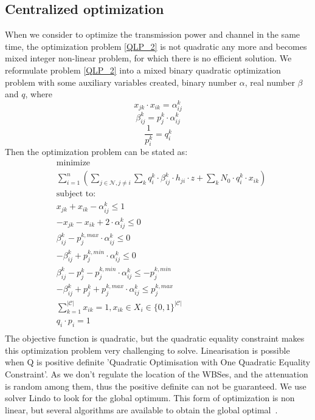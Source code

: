 \subsection{Centralized optimization}
\label{opt_channelAndPower}
When we consider to optimize the transmission power and channel in the same time, the optimization problem \ref{QLP_2} is not quadratic any more and becomes mixed integer non-linear problem, for which there is no efficient solution.
We reformulate problem \ref{QLP_2} into a mixed binary quadratic optimization problem with some auxiliary variables created, \ie binary number $\alpha$, real number $\beta$ and $q$, where
	\begin{equation}
	\label{alpha_opt}
x_{jk}\cdot x_{ik} =\alpha_{ij}^k
	\end{equation}
	\begin{equation}
	\label{beta_opt}
\beta_{ij}^k = p_j^k\cdot \alpha_{ij}^k
	\end{equation}
	\begin{equation}
	\label{q_opt}	
\frac{1}{p_i^k} = q_i^k
	\end{equation}
Then the optimization problem can be stated as:
	\begin{equation}
\label{midp}
			\begin{aligned}
			& \underset{}{\text{minimize}}\\
			&\sum\limits^{n}_{i=1}(\sum\limits_{j\in\mathcal{N}, j\neq i}\sum\limits_k q_{i}^k\cdot \beta_{ij}^k \cdot h_{ji}\cdot z + \sum\limits_k N_0\cdot q_{i}^k\cdot x_{ik})\\
			& \text{subject to:} \\
			& x_{jk} + x_{ik} - \alpha_{ij}^k\leq 1 \\
			& -x_{jk} - x_{ik} +2\cdot \alpha_{ij}^k \leq 0 \\
			& \beta_{ij}^k - p_j^{k,max}\cdot \alpha_{ij}^k \leq 0 \\
			& - \beta_{ij}^k + p_j^{k,min}\cdot \alpha_{ij}^k \leq 0 \\
			& \beta_{ij}^k - p_j^k - p_j^{k,min}\cdot \alpha_{ij}^k \leq -p_j^{k,min} \\			
			& -\beta_{ij}^k + p_j^k + p_j^{k,max}\cdot \alpha_{ij}^k \leq p_j^{k,max} \\			
			& \sum\limits_{k=1}^{|\mathcal{C}|}x_{ik}=1, x_{ik}\in X_i\in \{0,1\}^{|\mathcal{C}|}\\
			& q_i\cdot p_i =1\\
			\end{aligned}
		\end{equation}
The objective function is quadratic, but the quadratic equality constraint makes this optimization problem very challenging to solve.
Linearisation is possible when Q is positive definite 'Quadratic Optimisation with One Quadratic Equality
Constraint'.
As we don't regulate the location of the WBSes, and the attenuation is random among them, thus the positive definite can not be guaranteed.
We use solver Lindo to look for the global optimum.
This form of optimization is non linear, but several algorithms are available to obtain the global optimal~\cite{hmam2010quadratic,Quadratic_min_one_equality}.		

